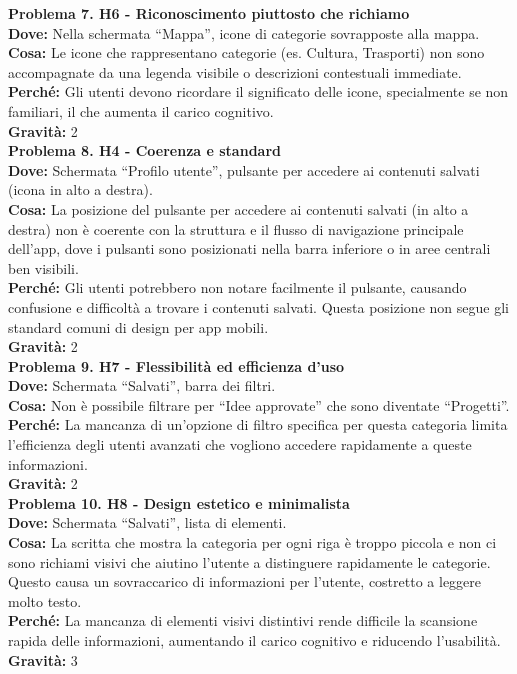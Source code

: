 \documentclass[a4paper,12pt]{article}
\begin{document}
\textbf{Problema 7. H6 - Riconoscimento piuttosto che richiamo} \\
\textbf{Dove:} Nella schermata “Mappa”, icone di categorie sovrapposte alla mappa. \\
\textbf{Cosa:} Le icone che rappresentano categorie (es. Cultura, Trasporti) non sono accompagnate da una legenda visibile o descrizioni contestuali immediate. \\
\textbf{Perché:} Gli utenti devono ricordare il significato delle icone, specialmente se non familiari, il che aumenta il carico cognitivo. \\
\textbf{Gravità:} 2 \\[1em]

\textbf{Problema 8. H4 - Coerenza e standard} \\
\textbf{Dove:} Schermata “Profilo utente”, pulsante per accedere ai contenuti salvati (icona in alto a destra). \\
\textbf{Cosa:} La posizione del pulsante per accedere ai contenuti salvati (in alto a destra) non è coerente con la struttura e il flusso di navigazione principale dell’app, dove i pulsanti sono posizionati nella barra inferiore o in aree centrali ben visibili. \\
\textbf{Perché:} Gli utenti potrebbero non notare facilmente il pulsante, causando confusione e difficoltà a trovare i contenuti salvati. Questa posizione non segue gli standard comuni di design per app mobili. \\
\textbf{Gravità:} 2 \\[1em]

\textbf{Problema 9. H7 - Flessibilità ed efficienza d’uso} \\
\textbf{Dove:} Schermata “Salvati”, barra dei filtri. \\
\textbf{Cosa:} Non è possibile filtrare per “Idee approvate” che sono diventate “Progetti”. \\
\textbf{Perché:} La mancanza di un’opzione di filtro specifica per questa categoria limita l’efficienza degli utenti avanzati che vogliono accedere rapidamente a queste informazioni. \\
\textbf{Gravità:} 2 \\[1em]

\textbf{Problema 10. H8 - Design estetico e minimalista} \\
\textbf{Dove:} Schermata “Salvati”, lista di elementi. \\
\textbf{Cosa:} La scritta che mostra la categoria per ogni riga è troppo piccola e non ci sono richiami visivi che aiutino l’utente a distinguere rapidamente le categorie. Questo causa un sovraccarico di informazioni per l’utente, costretto a leggere molto testo. \\
\textbf{Perché:} La mancanza di elementi visivi distintivi rende difficile la scansione rapida delle informazioni, aumentando il carico cognitivo e riducendo l’usabilità. \\
\textbf{Gravità:} 3 \\[1em]
\end{document}
